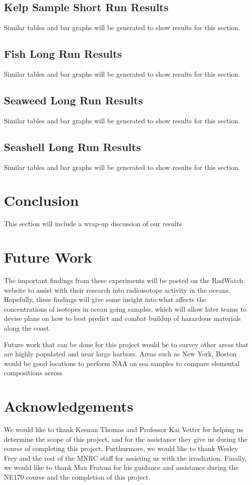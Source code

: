 \documentclass[]{article}
\begin{document}
\pagebreak

\subsection{Kelp Sample Short Run Results}
Similar tables and bar graphs will be generated to show results for this section.

\subsection{Fish Long Run Results}
Similar tables and bar graphs will be generated to show results for this section.
\subsection{Seaweed Long Run Results}
Similar tables and bar graphs will be generated to show results for this section.
\subsection{Seashell Long Run Results}
Similar tables and bar graphs will be generated to show results for this section.

\section{Conclusion}
This section will include a wrap-up discussion of our results


\section{Future Work}

The important findings from these experiments will be posted on the RadWatch website to assist with their research into radioisotope activity in the oceans. Hopefully, these findings will give some insight into what affects the concentrations of isotopes in ocean going samples, which will allow later teams to devise plans on how to best predict and combat buildup of hazardous materials along the coast. 

Future work that can be done for this project would be to survey other areas that are highly populated and near large harbors. Areas such as New York, Boston would be good locations to perform NAA on sea samples to compare elemental compositions across 



\section{Acknowledgements}

We would like to thank Keenan Thomas and Professor Kai Vetter for helping us determine the scope of this project, and for the assistance they give us during the course of completing this project. Furthurmore, we would like to thank Wesley Frey and the rest of the MNRC staff for assisting us with the irradiation. Finally, we would like to thank Max Fratoni for his guidance and assistance during the NE170 course and the completion of this project.
\end{document}
